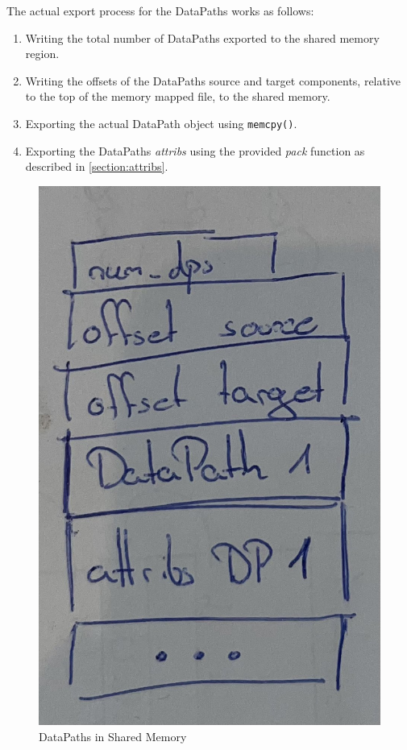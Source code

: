 The actual export process for the DataPaths works as follows:

\begin{enumerate}
    \item Writing the total number of DataPaths exported to the shared memory region.
    \item Writing the offsets of the DataPaths source and target components, relative to the top of the memory mapped file, to the shared memory.
    \item Exporting the actual DataPath object using \lstinline{memcpy()}.
    \item Exporting the DataPaths \emph{attribs} using the provided \emph{pack} function as described in \autoref{section:attribs}.
\end{enumerate}

\begin{figure}[!ht] %
    \includegraphics[scale=0.15]{images/export_dps.jpg} %
    \centering
    \caption{DataPaths in Shared Memory}
    \label{figure:export_dps}
\end{figure}

